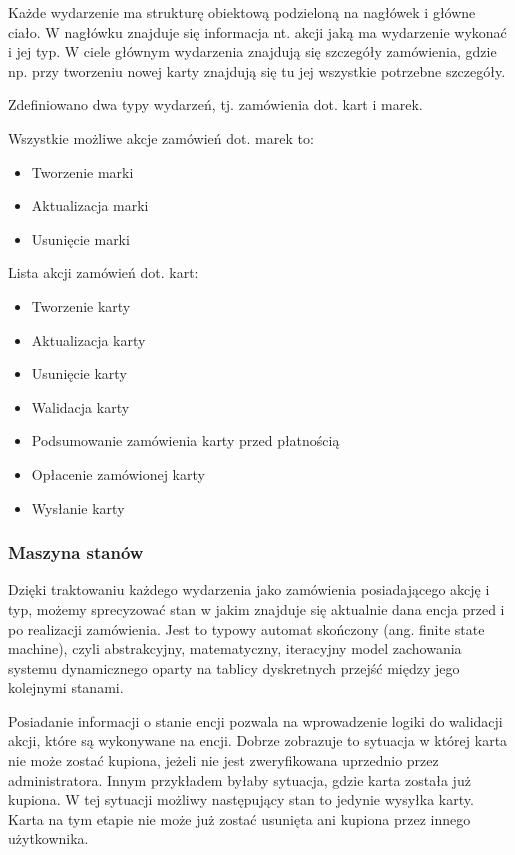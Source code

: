 Każde wydarzenie ma strukturę obiektową podzieloną na nagłówek i główne ciało. W nagłówku znajduje się informacja nt. akcji jaką ma wydarzenie wykonać i jej typ. W ciele głównym wydarzenia znajdują się szczegóły zamówienia, gdzie np. przy tworzeniu nowej karty znajdują się tu jej wszystkie potrzebne szczegóły.

Zdefiniowano dwa typy wydarzeń, tj. zamówienia dot. kart i marek.

Wszystkie możliwe akcje zamówień dot. marek to:
\begin{itemize}
    \item Tworzenie marki
    \item Aktualizacja marki
    \item Usunięcie marki
\end{itemize}

Lista akcji zamówień dot. kart:
\begin{itemize}
    \item Tworzenie karty
    \item Aktualizacja karty
    \item Usunięcie karty
    \item Walidacja karty
    \item Podsumowanie zamówienia karty przed płatnością
    \item Opłacenie zamówionej karty
    \item Wysłanie karty
\end{itemize}


\subsubsection{Maszyna stanów}
Dzięki traktowaniu każdego wydarzenia jako zamówienia posiadającego akcję i typ, możemy sprecyzować stan w jakim znajduje się aktualnie dana encja przed i po realizacji zamówienia. Jest to typowy automat skończony (ang. finite state machine), czyli abstrakcyjny, matematyczny, iteracyjny model zachowania systemu dynamicznego oparty na tablicy dyskretnych przejść między jego kolejnymi stanami. \cite{AutomatSkonczony}

Posiadanie informacji o stanie encji pozwala na wprowadzenie logiki do walidacji akcji, które są wykonywane na encji.
Dobrze zobrazuje to sytuacja w której karta nie może zostać kupiona, jeżeli nie jest zweryfikowana uprzednio przez administratora. Innym przykładem byłaby sytuacja, gdzie karta została już kupiona. W tej sytuacji możliwy następujący stan to jedynie wysyłka karty. Karta na tym etapie nie może już zostać usunięta ani kupiona przez innego użytkownika.


